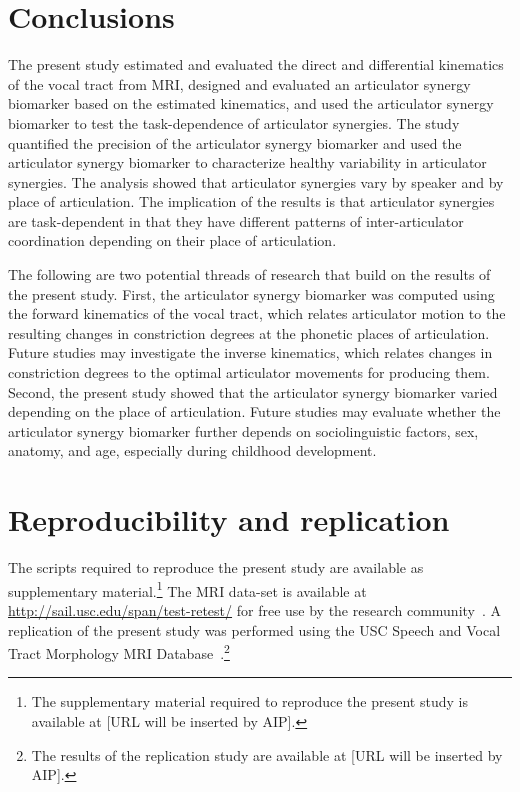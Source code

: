 \documentclass[preprint]{JASAnew}\usepackage[]{graphicx}\usepackage[]{color}
\begin{document}
\section{Conclusions}

The present study estimated and evaluated the direct and differential kinematics of the vocal tract from MRI, 
%
designed and evaluated an articulator synergy biomarker based on the estimated kinematics, and
%
used the articulator synergy biomarker to test the task-dependence of articulator synergies.
%
The study quantified the precision of the articulator synergy biomarker and used the articulator synergy biomarker to characterize healthy variability in articulator synergies. 
%
The analysis showed that articulator synergies vary by speaker and by place of articulation. 
%
The implication of the results is that articulator synergies are task-dependent in that they have different patterns of inter-articulator coordination depending on their place of articulation. 



The following are two potential threads of research that build on the results of the present study.
First, the articulator synergy biomarker was computed using the forward kinematics of the vocal tract, which relates articulator motion to the resulting changes in constriction degrees at the phonetic places of articulation. Future studies may investigate the inverse kinematics, which relates changes in constriction degrees to the optimal articulator movements for producing them. 
%
Second, the present study showed that the articulator synergy biomarker varied depending on the place of articulation. Future studies may evaluate whether the articulator synergy biomarker further depends on sociolinguistic factors, sex, anatomy, and age, especially during childhood development.

\section{Reproducibility and replication}

The scripts required to reproduce the present study are available as supplementary material.\footnote{The supplementary material required to reproduce the present study is available at [URL will be inserted by AIP].}
%
The MRI data-set is available at \url{http://sail.usc.edu/span/test-retest/} for free use by the research community~\citep[see][]{toger2017test}.
%
A replication of the present study was performed using the USC Speech and Vocal Tract Morphology MRI Database~\citep{sorensen2017database}.\footnote{The results of the replication study are available at [URL will be inserted by AIP].}
\end{document}
